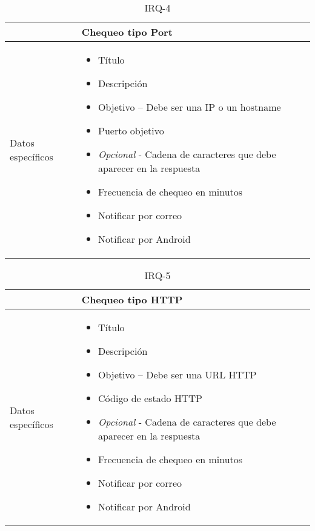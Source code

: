 \begin{table}[h!]
  \centering
  \begin{tabularx}{\textwidth}{|l|X|}
    \hline

    & Chequeo tipo Port \\

    \hline
    Datos específicos &

    \begin{itemize}
      \item Título 
      \item Descripción
      \item Objetivo -- Debe ser una IP o un hostname
      \item Puerto objetivo
      \item \textit{Opcional} - Cadena de caracteres que debe aparecer en la respuesta
      \item Frecuencia de chequeo en minutos
      \item Notificar por correo
      \item Notificar por Android
    \end{itemize}
    \\
    
    \hline
    
  \end{tabularx}
  \caption{IRQ-4}
\end{table}

\begin{table}[h!]
  \centering
  \begin{tabularx}{\textwidth}{|l|X|}
    \hline

    & Chequeo tipo HTTP \\

    \hline
    Datos específicos &

    \begin{itemize}
      \item Título 
      \item Descripción
      \item Objetivo -- Debe ser una \ac{URL} \ac{HTTP}
      \item Código de estado HTTP
      \item \textit{Opcional} - Cadena de caracteres que debe aparecer en la respuesta
      \item Frecuencia de chequeo en minutos
      \item Notificar por correo
      \item Notificar por Android
    \end{itemize}
    \\
    
    \hline
    
  \end{tabularx}
  \caption{IRQ-5}
\end{table}

